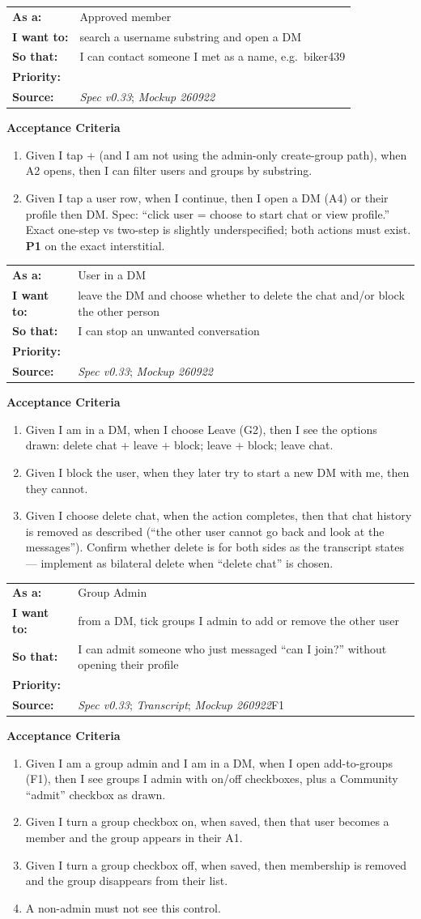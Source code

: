 \documentclass[11pt,a4paper]{article}
\makeatletter
\newcommand{\priPzero}{\colorbox{p0}{\makebox[4.6em]{\textcolor{white}{\scriptsize\bfseries P0 V1}}}}
\newcommand{\srcSpec}{\textit{Spec v0.33}}
\newcommand{\srcTx}{\textit{Transcript}}
\newcommand{\srcMock}{\textit{Mockup 260922}}
\newenvironment{story}[1]{%
  \Needspace{10\baselineskip}%
  \vspace{0.7em}%
  \noindent
  \colorbox{navy}{\makebox[\dimexpr\textwidth-2\fboxsep\relax][l]{\textcolor{white}{\bfseries\ #1}}}%
  \par\vspace{0.35em}%
}{\par\vspace{0.55em}}
\newcommand{\storymeta}[5]{%
  \noindent
  \begin{tabularx}{\textwidth}{@{}>{\bfseries}l X@{}}
    As a: & #1 \\
    I want to: & #2 \\
    So that: & #3 \\
    Priority: & #4 \\
    Source: & #5 \\
  \end{tabularx}
  \par\vspace{0.3em}
}
\newcommand{\achead}{\noindent\textbf{Acceptance Criteria}\par}
\makeatother
\begin{document}
\begin{story}{DM-003 --- Start or find a DM via plus (A2)}
\storymeta{Approved member}{search a username substring and open a DM}{I can contact someone I met as a name, e.g.\ biker439}{\priPzero}{\srcSpec; \srcMock}
\achead
\begin{enumerate}
  \item Given I tap + (and I am not using the admin-only create-group path), when A2 opens, then I can filter users and groups by substring.
  \item Given I tap a user row, when I continue, then I open a DM (A4) or their profile then DM. Spec: ``click user = choose to start chat or view profile.'' Exact one-step vs two-step is slightly underspecified; both actions must exist. \textbf{P1} on the exact interstitial.
\end{enumerate}
\end{story}

\begin{story}{DM-004 --- Leave, delete history, and block}
\storymeta{User in a DM}{leave the DM and choose whether to delete the chat and/or block the other person}{I can stop an unwanted conversation}{\priPzero}{\srcSpec; \srcMock}
\achead
\begin{enumerate}
  \item Given I am in a DM, when I choose Leave (G2), then I see the options drawn: delete chat + leave + block; leave + block; leave chat.
  \item Given I block the user, when they later try to start a new DM with me, then they cannot.
  \item Given I choose delete chat, when the action completes, then that chat history is removed as described (``the other user cannot go back and look at the messages''). Confirm whether delete is for both sides as the transcript states --- implement as bilateral delete when ``delete chat'' is chosen.
\end{enumerate}
\end{story}

\begin{story}{DM-005 --- Admin: add/remove this DM user on groups I admin}
\storymeta{Group Admin}{from a DM, tick groups I admin to add or remove the other user}{I can admit someone who just messaged ``can I join?'' without opening their profile}{\priPzero}{\srcSpec; \srcTx; \srcMock F1}
\achead
\begin{enumerate}
  \item Given I am a group admin and I am in a DM, when I open add-to-groups (F1), then I see groups I admin with on/off checkboxes, plus a Community ``admit'' checkbox as drawn.
  \item Given I turn a group checkbox on, when saved, then that user becomes a member and the group appears in their A1.
  \item Given I turn a group checkbox off, when saved, then membership is removed and the group disappears from their list.
  \item A non-admin must not see this control.
\end{enumerate}
\end{story}
\end{document}
